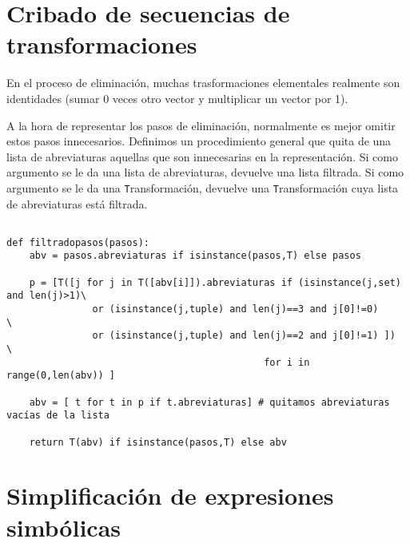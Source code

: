 \documentclass[11pt]{report}
\begin{document}
\section{Cribado de secuencias de transformaciones}
\label{sec:org35b9f4b}

En el proceso de eliminación, muchas trasformaciones elementales
realmente son identidades (sumar 0 veces otro vector y multiplicar un
vector por 1).

A la hora de representar los pasos de eliminación, normalmente es
mejor omitir estos pasos innecesarios. Definimos un procedimiento
general que quita de una lista de abreviaturas aquellas que son
innecesarias en la representación. Si como argumento se le da una
lista de abreviaturas, devuelve una lista filtrada. Si como argumento
se le da una \texttt{T}ransformación, devuelve una
\texttt{T}ransformación cuya lista de abreviaturas está filtrada.

\begin{verbatim}

def filtradopasos(pasos):
    abv = pasos.abreviaturas if isinstance(pasos,T) else pasos
           
    p = [T([j for j in T([abv[i]]).abreviaturas if (isinstance(j,set) and len(j)>1)\
               or (isinstance(j,tuple) and len(j)==3 and j[0]!=0)       \
               or (isinstance(j,tuple) and len(j)==2 and j[0]!=1) ])    \
                                             for i in range(0,len(abv)) ]

    abv = [ t for t in p if t.abreviaturas] # quitamos abreviaturas vacías de la lista
    
    return T(abv) if isinstance(pasos,T) else abv

\end{verbatim}

\section{Simplificación de expresiones simbólicas}
\label{sec:orga7b5269}
\end{document}
